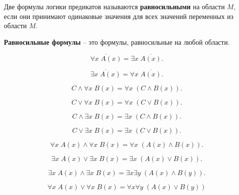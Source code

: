 Две формулы логики предикатов называются \textbf{равносильными} на области \(M\), если они принимают одинаковые значения для всех значений переменных из области \(M\).

\textbf{Равносильные формулы} -- это формулы, равносильные на любой области.

\begin{example}
    \[
        \overline{\forall x \; A(x)} = \exists x \; \overline{A(x)}.
    \]
\end{example}

\begin{example}
    \[
        \overline{\exists x \; A(x)} = \forall x \; \overline{A(x)}.
    \]
\end{example}

\begin{example}
    \[
        C \land \forall x \; B(x) = \forall x \; (C \land B(x)).
    \]
\end{example}

\begin{example}
    \[
        C \lor \forall x \; B(x) = \forall x \; (C \lor B(x)).
    \]
\end{example}

\begin{example}
    \[
        C \land \exists x \; B(x) = \exists x \; (C \land B(x)).
    \]
\end{example}

\begin{example}
    \[
        C \lor \exists x \; B(x) = \exists x \; (C \lor B(x)).
    \]
\end{example}

\begin{example}
    \[
        \forall x \; A(x) \land \forall x \; B(x) = \forall x \; (A(x) \land B(x)).
    \]
\end{example}

\begin{example}
    \[
        \exists x \; A(x) \lor \exists x \; B(x) = \exists x \; (A(x) \lor B(x)).
    \]
\end{example}

\begin{example}
    \[
        \exists x \; A(x) \land \exists x \; B(x) = \exists x \exists y \; (A(x) \land B(y)).
    \]
\end{example}

\begin{example}
    \[
        \forall x \; A(x) \lor \forall x \; B(x) = \forall x \forall y \; (A(x) \lor B(y))
    \]
\end{example}

